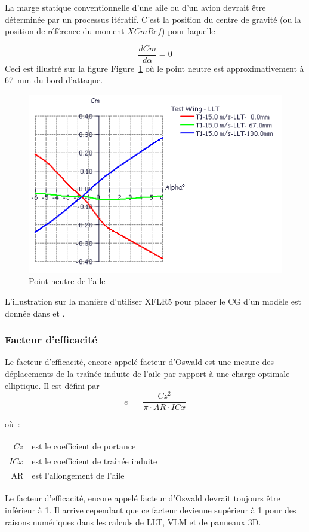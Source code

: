\documentclass[a4paper,twoside,12pt,dvips]{article}
\begin{document}
La marge statique conventionnelle d’une aile ou d’un avion devrait être déterminée par un processus itératif. C’est la position du centre de gravité (ou
la position de référence du moment $XCmRef$) pour laquelle 

$$\frac {dCm} {d\alpha} = 0$$
Ceci est illustré sur la figure Figure~\ref{img:point_neutre_aile}
où le point neutre est approximativement à 67~mm du bord d’attaque. 

\begin{figure}[htbp]
	\centering
	\includegraphics[width=0.8\linewidth]{img-33}
	\caption{Point neutre de l’aile}
	\label{img:point_neutre_aile}
\end{figure}

L’illustration sur la manière d’utiliser XFLR5 pour placer le CG d’un modèle est donnée dans \cite{DeperroisStab} et \cite{DeperroisNotions}.

\clearpage

\subsubsection{Facteur d’efficacité}
Le facteur d’efficacité, encore appelé facteur d’Oswald est une mesure des 
déplacements de la traînée induite de l’aile par rapport à une charge optimale 
elliptique. Il est défini par
$$e~=~\frac{Cz^2} {\pi \cdot AR \cdot ICx}$$

où~:

\begin{tabular}{rl}
	$Cz$ & est le coefficient de portance\\
	$ICx$ & est le coefficient de traînée induite\\
	AR & est l’allongement de l’aile
\end{tabular}

Le facteur d’efficacité, encore appelé facteur d’Oswald devrait toujours être inférieur à 1. Il arrive cependant que ce facteur devienne supérieur à 1 pour des raisons numériques dans les calculs de LLT, VLM et de panneaux 3D. 
\end{document}
